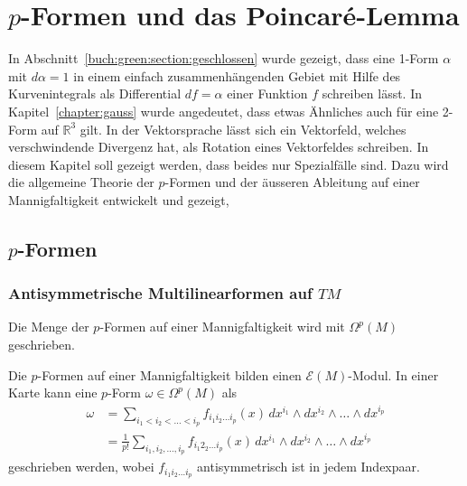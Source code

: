 %
%
%
\chapter{$p$-Formen und das Poincaré-Lemma
\label{chapter:pformen}}
In Abschnitt~\ref{buch:green:section:geschlossen} wurde gezeigt, dass eine
1-Form $\alpha$ mit $d\alpha=1$ in einem einfach zusammenhängenden Gebiet
mit Hilfe des Kurvenintegrals als Differential $df=\alpha$ einer Funktion
$f$ schreiben lässt.
In Kapitel~\ref{chapter:gauss} wurde angedeutet, dass etwas Ähnliches auch
für eine 2-Form auf $\mathbb{R}^3$ gilt.
In der Vektorsprache lässt sich ein Vektorfeld, welches verschwindende
Divergenz hat, als Rotation eines Vektorfeldes schreiben.
In diesem Kapitel soll gezeigt werden, dass beides nur Spezialfälle sind.
Dazu wird die allgemeine Theorie der $p$-Formen und der äusseren Ableitung
auf einer Mannigfaltigkeit entwickelt und gezeigt, 

%
%
\section{$p$-Formen
\label{buch:pformen:section:pformen}}

%
%
\subsection{Antisymmetrische Multilinearformen auf $TM$}

\begin{definition}
Die Menge der $p$-Formen auf einer Mannigfaltigkeit wird mit $\Omega^p(M)$
geschrieben.
\end{definition}

\begin{satz}
Die $p$-Formen auf einer Mannigfaltigkeit bilden einen $\mathscr{E}(M)$-Modul.
In einer Karte kann eine $p$-Form $\omega\in \Omega^p(M)$ als
\begin{align*}
\omega
&=
\sum_{i_1<i_2<\dots< i_p}
f_{i_1 i_2\dots i_p}(x)
\, dx^{i_1}\wedge dx^{i_2}\wedge\dots\wedge dx^{i_p}
\\
&=
\frac{1}{p!}
\sum_{i_1,i_2,\dots,i_p}
f_{i_1 2_2\dots i_p}(x)
\, dx^{i_1}\wedge dx^{i_2}\wedge\dots\wedge dx^{i_p}
\end{align*}
geschrieben werden, wobei $f_{i_1 i_2\dots i_p}$  antisymmetrisch ist in jedem
Indexpaar.
\end{satz}

